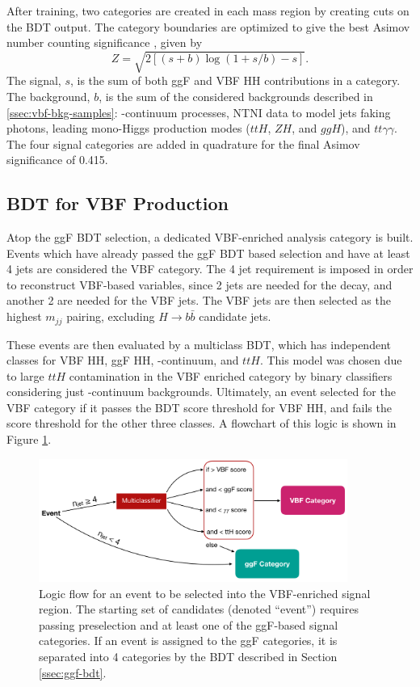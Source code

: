 After training, two categories are created in each mass region by creating cuts on the BDT output. The category boundaries are optimized to give the best Asimov number counting significance \cite{asimov}, given by
\begin{equation}\label{eqn:asimov-significance}
    Z = \sqrt{2[(s+b)\log{(1 + s/b)} -s]}.
\end{equation}
The signal, $s$, is the sum of both ggF and VBF HH contributions in a category. The background, $b$, is the sum of the considered backgrounds described in \ref{ssec:vbf-bkg-samples}: \yy-continuum processes, \gls{NTNI} data to model jets faking photons, leading mono-Higgs production modes ($ttH$, $ZH$, and $ggH$), and $tt\gamma\gamma$. The four signal categories are added in quadrature for the final Asimov significance of 0.415.


\subsection{BDT for VBF Production}\label{ssec:vbf-bdt}
Atop the ggF \gls{BDT} selection, a dedicated VBF-enriched analysis category is built. Events which have already passed the ggF BDT based selection and have at least 4 jets are considered the VBF category. The 4 jet requirement is imposed in order to reconstruct VBF-based variables, since 2 jets are needed for the \Hbb decay, and another 2 are needed for the VBF jets. The VBF jets are then selected as the highest $m_{jj}$ pairing, excluding $H\rightarrow b\bar{b}$ candidate jets.

These events are then evaluated by a multiclass BDT, which has independent classes for VBF HH, ggF HH, \yy-continuum, and $ttH$. This model was chosen due to large $ttH$ contamination in the VBF enriched category by binary classifiers considering just \yy-continuum backgrounds. Ultimately, an event selected for the VBF category if it passes the BDT score threshold for VBF HH, and fails the score threshold for the other three classes. A flowchart of this logic is shown in Figure \ref{fig:vbf-logic}.

\begin{figure}[htbp]
    \centering
	\includegraphics[width=0.9\textwidth]{chapters/chapter6_vbf/images/vbf_logic.png}
    \caption{Logic flow for an event to be selected into the VBF-enriched signal region. The starting set of candidates (denoted ``event'') requires passing preselection and at least one of the ggF-based signal categories. If an event is assigned to the ggF categories, it is separated into 4 categories by the \gls{BDT} described in Section \ref{ssec:ggf-bdt}.}
    \label{fig:vbf-logic}
\end{figure}

